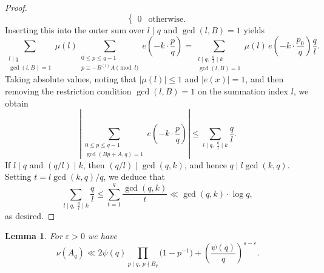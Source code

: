 \documentclass[12pt,a4paper,twoside]{article}
\newtheorem{lem}{Lemma}[section]
\begin{document}
\begin{proof}
\[\begin{cases}
0 & \text{otherwise}.
\end{cases}
\]
Inserting this into the outer sum over \(l \mid q\) and \(\gcd(l, B) = 1\) yields
\[
\sum_{\substack{l\mid q \\ \gcd(l,B)=1}} \mu(l) \sum_{\substack{0 \leq p \leq q-1 \\ p \equiv -B^{(l)}A \pmod{l}}} e\!\left(-k \cdot \frac{p}{q}\right)
= \sum_{\substack{l \mid q,\; \frac{q}{l} \mid k \\ \gcd(l,B)=1}} \mu(l) \, e\!\left(-k \cdot \frac{p_0}{q}\right) \frac{q}{l}.
\]
Taking absolute values, noting that \(|\mu(l)|\le 1\) and \(|e(x)| = 1\), and then removing the restriction condition \(\gcd(l,B)=1\) on the summation index \(l\), we obtain
\[
\left|\sum_{\substack{0\le p\le q-1 \\ \gcd(Bp+A,q)=1}} e\!\left(-k\cdot \frac{p}{q}\right)\right|
\le \sum_{l\mid q,\; \frac{q}{l}\mid k} \frac{q}{l}.
\]
If \(l\mid q\) and \((q/l)\mid k\), then \((q/l)\mid \gcd(q,k)\), and hence \(q\mid l\gcd(k,q)\). Setting \(t = l\gcd(k,q)/q\), we deduce that
\[
\sum_{l\mid q,\; \frac{q}{l}\mid k} \frac{q}{l}
\le \sum_{t=1}^{q} \frac{\gcd(q,k)}{t}
\ll \gcd(q,k)\cdot \log q,
\]
as desired.
\end{proof}




\begin{lem}\label{v-meas}
    For $\varepsilon>0$ we have
    \[\nu(A_q)\ll 2\psi(q) \prod_{ {p\mid q,~ p\nmid B_q}} \bigl(1 - p^{-1}\bigr)+ \left(\frac{\psi(q)}{q}\right)^{s-\varepsilon}.\]
\end{lem}
\end{document}

